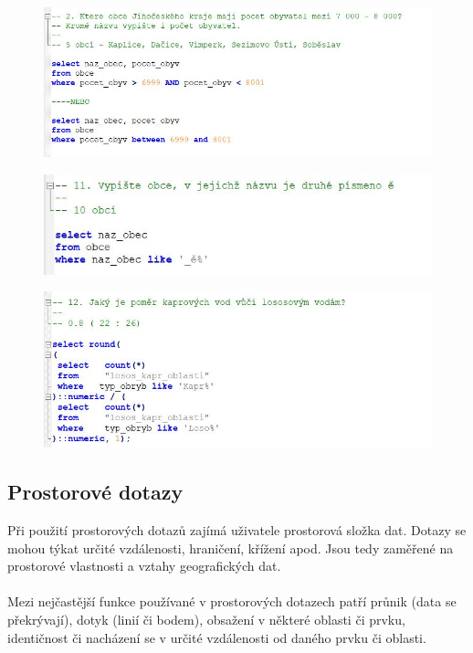 \documentclass[a4paper, 12pt]{article}
\begin{document}
\begin{figure}[h!]
	\centering
	\includegraphics[width=15cm]{pictures/at1.jpg}
\end{figure}

\begin{figure}[h!]
	\centering
	\includegraphics[width=15cm]{pictures/at2.jpg}
\end{figure}

\begin{figure}[h!]
	\centering
	\includegraphics[width=15cm]{pictures/at3.jpg}
\end{figure}

\subsection{Prostorové dotazy}
Při použití prostorových dotazů zajímá uživatele prostorová složka dat. Dotazy se mohou týkat určité vzdálenosti, hraničení, křížení apod. Jsou tedy zaměřené na prostorové vlastnosti a vztahy geografických dat. \\
\\
Mezi nejčastější funkce používané v prostorových dotazech patří průnik (data se překrývají), dotyk (linií či bodem), obsažení v některé oblasti či prvku, identičnost či nacházení se v určité vzdálenosti od daného prvku či oblasti. 
\end{document}
